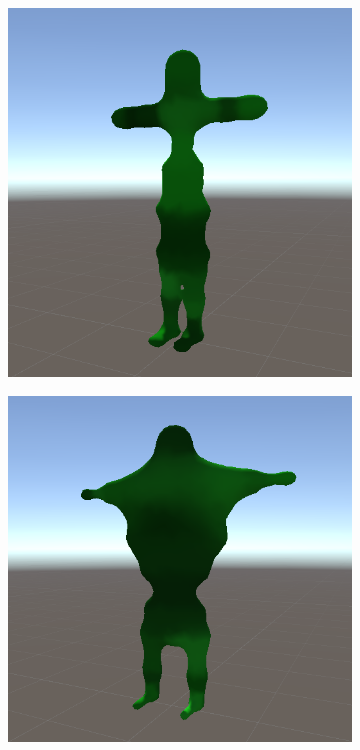 \begin{figure}[ht]
\begin{subfigure}[b]{0.2\textwidth}
        \includegraphics[width=\textwidth, height=\textwidth]{resources/img/Finished_Creatures_2/creature_2}
    \end{subfigure}
    \begin{subfigure}[b]{0.2\textwidth}
        \centering        
        \includegraphics[width=\textwidth, height=\textwidth]{resources/img/Finished_Creatures_2/creature_3}

\end{subfigure}
\end{figure}

